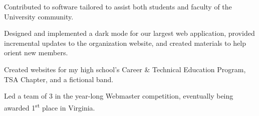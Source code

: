 \documentclass[]{deedy-resume-openfont}
\begin{document}
\begin{tightemize}
\item Contributed to software tailored to assist both students and faculty of the University community.
\item Designed and implemented a dark mode for our largest web application, provided incremental updates to the organization website, and created materials to help orient new members.
\end{tightemize}
\sectionsep

\begin{tightemize}
\item Created websites for my high school’s Career \& Technical Education Program,  TSA Chapter, and a fictional band.
\item Led a team of 3 in the year-long Webmaster competition, eventually being awarded 1\textsuperscript{st} place in Virginia.
\end{tightemize}
\end{document}
